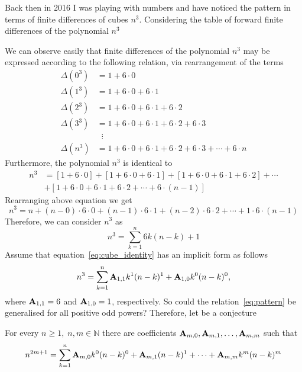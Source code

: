Back then in 2016 I was playing with numbers and have noticed the pattern in terms of finite differences
of cubes $n^3$.
Considering the table of forward finite differences of the polynomial $n^3$

We can observe easily that finite differences of the polynomial $n^3$ may be expressed according
to the following relation, via rearrangement of the terms
\begin{align*}
    \Delta(0^3) &= 1+6 \cdot 0 \\
    \Delta(1^3) &= 1+6\cdot0+6\cdot1 \\
    \Delta(2^3) &= 1+6\cdot0+6\cdot1+6\cdot2 \\
    \Delta(3^3) &= 1+6\cdot0+6\cdot1+6\cdot2+6\cdot3 \\
    &\; \; \vdots \\
    \Delta(n^3) &= 1+6\cdot0+6\cdot1+6\cdot2+6\cdot3+\cdots+6\cdot n
\end{align*}
Furthermore, the polynomial $n^3$ is identical to
\begin{align*}
    n^3 &= [1+6\cdot0]+[1+6\cdot0+6\cdot1]+[1+6\cdot0+6\cdot1+6\cdot2]+\cdots \\
    &+[1+6\cdot0+6\cdot1+6\cdot2+\cdots+6\cdot(n-1)]
\end{align*}
Rearranging above equation we get
\[
    n^3 = n +(n-0) \cdot6 \cdot0 + (n-1)\cdot6\cdot1 + (n-2)\cdot6\cdot2 + \cdots+1\cdot6\cdot(n-1)
\]
Therefore, we can consider $n^3$ as
\begin{equation}
    \label{eq:cube_identity}
    n^3 = \sum_{k=1}^{n} 6k(n-k) + 1
\end{equation}
%
Assume that equation~\eqref{eq:cube_identity} has an implicit form as follows
\begin{equation}
    \label{eq:pattern}
    n^3 = \sum_{k=1}^{n} {\mathbf{A}} \sb{1,1} k^1(n-k)^1 + {\mathbf{A}} \sb{1,0} k^0(n-k)^0,
\end{equation}
where ${\mathbf{A}} \sb{1,1} = 6$ and ${\mathbf{A}} \sb{1,0} = 1$, respectively.
So could the relation~\eqref{eq:pattern} be generalised for all positive odd powers?
Therefore, let be a conjecture
\begin{conj}
    For every $n\geq 1, \; n,m\in\mathbb{N}$ there are coefficients ${\mathbf{A}} \sb{m,0}, {\mathbf{A}} \sb{m,1}, \ldots, {\mathbf{A}} \sb{m,m}$ such that
    \begin{equation*}
        \label{conjecture}
        n^{2m+1} = \sum_{k=1}^{n} {\mathbf{A}} \sb{m,0} k^0 (n-k)^0 + {\mathbf{A}} \sb{m,1} (n-k)^1
        + \cdots + {\mathbf{A}} \sb{m,m} k^m (n-k)^m
    \end{equation*}
\end{conj}